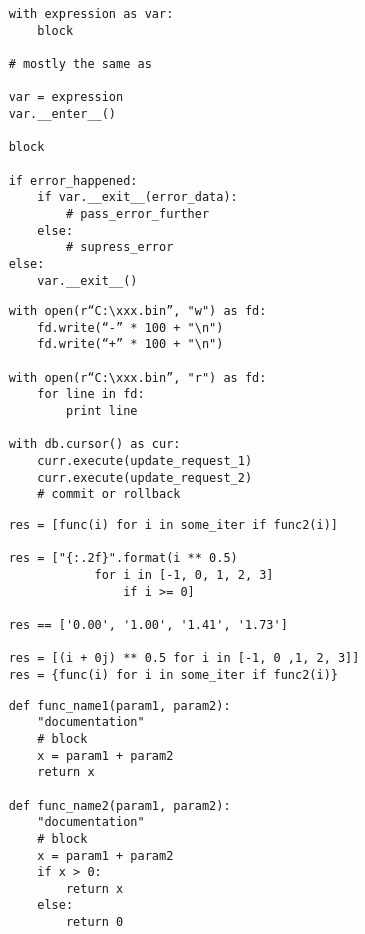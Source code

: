 \documentclass{article}
\begin{document}
\vspace{15pt}
\begin{lstlisting}
	with expression as var:
		block

	# mostly the same as
	
	var = expression
	var.__enter__()
	
	block
	
	if error_happened:
		if var.__exit__(error_data):
			# pass_error_further
		else:
			# supress_error
	else:
		var.__exit__()
\end{lstlisting}
\newpage

\vspace{15pt}
\begin{lstlisting}
	with open(r“C:\xxx.bin”, "w") as fd:
	    fd.write(“-” * 100 + "\n")
	    fd.write(“+” * 100 + "\n")

	with open(r“C:\xxx.bin”, "r") as fd:
	    for line in fd:
	    	print line

	with db.cursor() as cur:
	    curr.execute(update_request_1)
	    curr.execute(update_request_2)
		# commit or rollback
\end{lstlisting}
\newpage

\vspace{15pt}
\begin{lstlisting}
	res = [func(i) for i in some_iter if func2(i)]

	res = ["{:.2f}".format(i ** 0.5) 
				for i in [-1, 0, 1, 2, 3] 
					if i >= 0]
	
	res == ['0.00', '1.00', '1.41', '1.73']

	res = [(i + 0j) ** 0.5 for i in [-1, 0 ,1, 2, 3]]
	res = {func(i) for i in some_iter if func2(i)}
\end{lstlisting}
\newpage

\begin{lstlisting}
	def func_name1(param1, param2):
		"documentation"
		# block
		x = param1 + param2
		return x

	def func_name2(param1, param2):
		"documentation"
		# block
		x = param1 + param2
		if x > 0:
			return x
		else:
			return 0
\end{lstlisting}
\end{document}
